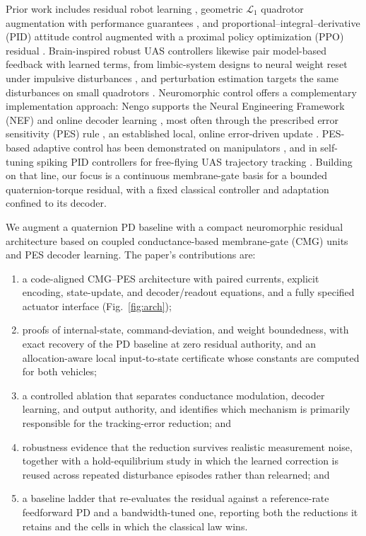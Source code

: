 \documentclass[letterpaper, 10 pt, conference]{ieeeconf}
\begin{document}
Prior work includes residual robot learning \cite{johannink2019}, geometric $\mathcal L_1$ quadrotor augmentation with performance guarantees \cite{wu2025l1quad}, and proportional--integral--derivative (PID) attitude control augmented with a proximal policy optimization (PPO) residual \cite{li2027hpappo}.
%
Brain-inspired robust UAS controllers likewise pair model-based feedback with learned terms, from limbic-system designs \cite{rubioscola2023limbic,escareno2024limbic} to neural weight reset under impulsive disturbances \cite{rubioscola2023weightreset}, and perturbation estimation targets the same disturbances on small quadrotors \cite{rubioscola2021mambo}.
Neuromorphic control offers a complementary implementation approach: Nengo supports the Neural Engineering Framework (NEF) \cite{eliasmith2004neuraleng} and online decoder learning \cite{bekolay2014nengo}, most often through the prescribed error sensitivity (PES) rule \cite{macneil2011pes}, an established local, online error-driven update \cite{voelker2015pes}. PES-based adaptive control has been demonstrated on manipulators \cite{dewolf2016arm,dewolf2020nengo}, and in self-tuning spiking PID controllers for free-flying UAS trajectory tracking \cite{olivares2025ifac,olivares2026selftuning}.
Building on that line, our focus is a continuous membrane-gate basis for a bounded quaternion-torque residual, with a fixed classical controller and adaptation confined to its decoder.

We augment a quaternion PD baseline with a compact neuromorphic residual architecture based on coupled conductance-based membrane-gate (CMG) units and PES decoder learning. The paper's contributions are:
\begin{enumerate}
    \item a code-aligned CMG--PES architecture with paired currents, explicit encoding, state-update, and decoder/readout equations, and a fully specified actuator interface (Fig.~\ref{fig:arch});
    \item proofs of internal-state, command-deviation, and weight boundedness, with exact recovery of the PD baseline at zero residual authority, and an allocation-aware local input-to-state certificate whose constants are computed for both vehicles;
    \item a controlled ablation that separates conductance modulation, decoder learning, and output authority, and identifies which mechanism is primarily responsible for the tracking-error reduction; and
    \item robustness evidence that the reduction survives realistic measurement noise, together with a hold-equilibrium study in which the learned correction is reused across repeated disturbance episodes rather than relearned; and
    \item a baseline ladder that re-evaluates the residual against a reference-rate feedforward PD and a bandwidth-tuned one, reporting both the reductions it retains and the cells in which the classical law wins.
\end{enumerate}
\end{document}
